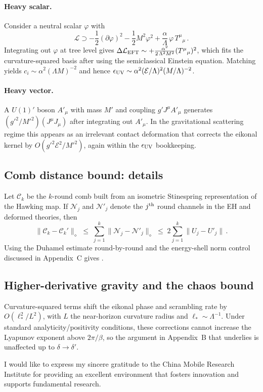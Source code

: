 \documentclass[a4paper,11pt]{article}
\theoremstyle{plain}
\theoremstyle{definition}
\theoremstyle{remark}
\begin{document}
\paragraph{Heavy scalar.} Consider a neutral scalar $\varphi$ with
\begin{equation}
\mathcal{L}\supset -\frac{1}{2}(\partial\varphi)^2-\frac{1}{2}M^2\varphi^2+\frac{\alpha}{\Lambda}\,\varphi\,T^\mu{}_\mu\,.
\end{equation}
Integrating out $\varphi$ at tree level gives $\Delta\mathcal{L}_{\rm EFT}\sim +\frac{\alpha^2}{2\,\Lambda^2 M^2}(T^\mu{}_\mu)^2$, which fits the curvature-squared basis after using the semiclassical Einstein equation. Matching yields $c_i\sim \alpha^2(\Lambda M)^{-2}$ and hence $\epsilon_{\rm UV}\sim \alpha^2(\mathcal{E}/\Lambda)^2(M/\Lambda)^{-2}$.

\paragraph{Heavy vector.} A $U(1)'$ boson $A'_\mu$ with mass $M'$ and coupling $g' J^\mu A'_\mu$ generates $(g'^2/M'^2)(J^\mu J_\mu)$ after integrating out $A'_\mu$. In the gravitational scattering regime this appears as an irrelevant contact deformation that corrects the eikonal kernel by $O(g'^2 \mathcal{E}^2/M'^2)$, again within the $\epsilon_{\rm UV}$ bookkeeping.

\subsection{Comb distance bound: details}
Let $\mathcal{C}_k$ be the $k$-round comb built from an isometric Stinespring representation of the Hawking map. If $\mathcal{N}_j$ and $\mathcal{N}'_j$ denote the $j^{\rm th}$ round channels in the EH and deformed theories, then
\begin{equation}
\big\|\mathcal{C}_k-\mathcal{C}_k'\big\|_\diamond \;\le\; \sum_{j=1}^k \big\|\mathcal{N}_j-\mathcal{N}'_j\big\|_\diamond \;\le\; 2\sum_{j=1}^k \big\|U_j-U'_j\big\|\,.
\end{equation}
Using the Duhamel estimate round-by-round and the energy-shell norm control discussed in Appendix~C gives .

\subsection{Higher-derivative gravity and the chaos bound}
Curvature-squared terms shift the eikonal phase and scrambling rate by $O(\ell_\ast^2/L^2)$, with $L$ the near-horizon curvature radius and $\ell_\ast\sim \Lambda^{-1}$. Under standard analyticity/positivity conditions, these corrections cannot increase the Lyapunov exponent above $2\pi/\beta$, so the argument in Appendix~B that underlies  is unaffected up to $\delta\to\delta'$.


\acknowledgments
 
I would like to express my sincere gratitude to the China Mobile Research Institute for 
providing an excellent environment that fosters innovation and supports fundamental research.




\end{document}
